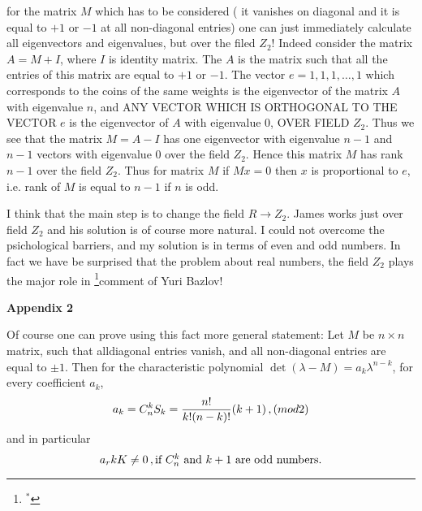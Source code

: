 for the matrix $M$ which has to be considered (
it vanishes on diagonal and
 it is equal to $+1$ or $-1$ at all non-diagonal entries)
one can just immediately calculate all eigenvectors and eigenvalues,
but over the filed $Z_2$!
Indeed consider the matrix $A=M+I$, where $I$ is identity matrix.
 The  $A$ is the
matrix such that all  the entries
of this matrix are equal to $+1$ or $-1$. The vector
  $e={1,1,1,\dots,1}$ which corresponds to the coins of the same weights
is  the eigenvector of the matrix $A$
with eigenvalue $n$, and ANY VECTOR WHICH IS ORTHOGONAL TO THE VECTOR
$e$ is the eigenvector of $A$ with eigenvalue $0$, OVER FIELD $Z_2$.
Thus we see that the matrix $M=A-I$ has one eigenvector with eigenvalue
$n-1$ and $n-1$ vectors with eigenvalue $0$ over the field
$Z_2$. Hence this matrix   $M$
  has rank $n-1$ over the field $Z_2$.
Thus for matrix  $M$
  if $Mx=0$ then $x$ is proportional to $e$, i.e. rank
of $M$ is equal to $n-1$ if $n$ is odd.

I think that the main step is to change the field $R\to Z_2$.
James works just over field $Z_2$ and his solution
is of course more natural.
    I could not overcome the psichological barriers, and my solution
is in terms of even and odd numbers.
    In fact we have be surprised that
the problem about real numbers, the field $Z_2$ plays the major role in
\footnote{$^*$}{comment of Yuri Bazlov}!
 


\m

         {\bf Appendix 2}

Of course one can prove using this fact more general statement:
  Let $M$ be $n\times n$ matrix, such that alldiagonal entries
vanish, and all non-diagonal entries are equal to $\pm 1$.
Then for the characteristic polynomial
             $
     \det (\lambda-M) =a_k\lambda^{n-k}
             $,
for every coefficient $a_k$,
                $$
a_k=C^k_n S_k={n!\over k!(n-k)!}(k+1) \,,(mod 2)
                   $$
and in particular
              $$
a_rkK\not=0\,, \hbox {if $C^k_n$ and $k+1$ are odd numbers}.
            $$

           
 
\bye
